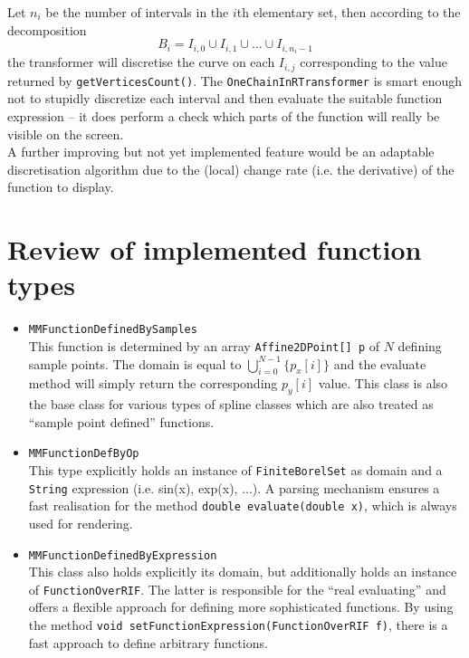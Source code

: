 \documentclass[a4paper,12pt]{book}
\begin{document}
\begin{appendix}
Let $n_i$ be the number of intervals in the $i$th elementary set, then according to the decomposition
\[
B_i = I_{i,0}\cup I_{i,1}\cup\ldots\cup I_{i,n_i-1}
\]
the transformer will discretise the curve on each $I_{i,j}$ corresponding to the value returned by {\texttt{getVerticesCount()}}. The {\texttt {OneChainInRTransformer}} is smart enough not to stupidly discretize each interval and then evaluate the suitable function
expression -- it does perform a check which parts of the function will really be visible on the
screen.\\
A further improving but not yet implemented feature would be an adaptable
  discretisation algorithm due to the (local) change rate (i.e. the derivative) of the function to display.\\[1ex]

\section{Review of implemented function types}
\begin{itemize}
\item {\texttt {MMFunctionDefinedBySamples}}\\
This function is determined by an array {\texttt {Affine2DPoint[] p}} of $N$ defining sample
points. The domain is equal to $\bigcup_{i=0}^{N-1}\{p_x[i]\}$ and the evaluate method will simply
return the corresponding $p_y[i]$ value. This class is also the base class for various types
of spline classes which are also treated as ``sample point defined'' functions.

\item {\texttt {MMFunctionDefByOp}}\\
This type explicitly holds an instance of {\texttt {FiniteBorelSet}} as domain and a {\texttt {String}}
expression (i.e. sin(x), exp(x), $\ldots$). A parsing mechanism ensures a fast realisation
for the method {\texttt {double evaluate(double x)}}, which is always used for rendering.

\item {\texttt {MMFunctionDefinedByExpression}}\\
This class also holds explicitly its domain, but additionally holds an instance of {\texttt
  {FunctionOverRIF}}. The latter is responsible for the ``real evaluating'' and offers a flexible
approach for defining more sophisticated functions. By using the method {\texttt {void
  setFunctionExpression(FunctionOverRIF f)}}, there is a fast approach to define arbitrary functions.


\end{itemize}
\end{appendix}
\end{document}
